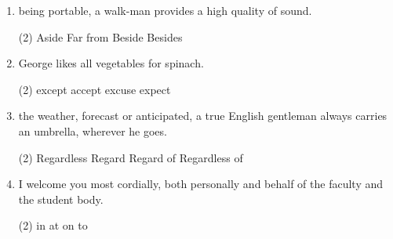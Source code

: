 \begin{enumerate}
\item \ttu being portable, a walk-man provides a high quality of sound.
  \begin{tasks}(2)
    \task Aside
    \task Far from
    \task Beside
    \task Besides
  \end{tasks}

\item George likes all vegetables \ttu for spinach.
  \begin{tasks}(2)
    \task except
    \task accept
    \task excuse
    \task expect
  \end{tasks}

\item \ttu the weather, forecast or anticipated, a true English gentleman always
  carries an umbrella, wherever he goes.
  \begin{tasks}(2)
    \task Regardless
    \task Regard
    \task Regard of
    \task Regardless of
  \end{tasks}

\item I welcome you most cordially, both personally and \ttu behalf of the faculty and the student body.
  \begin{tasks}(2)
    \task in
    \task at
    \task on
    \task to
  \end{tasks}
\end{enumerate}

